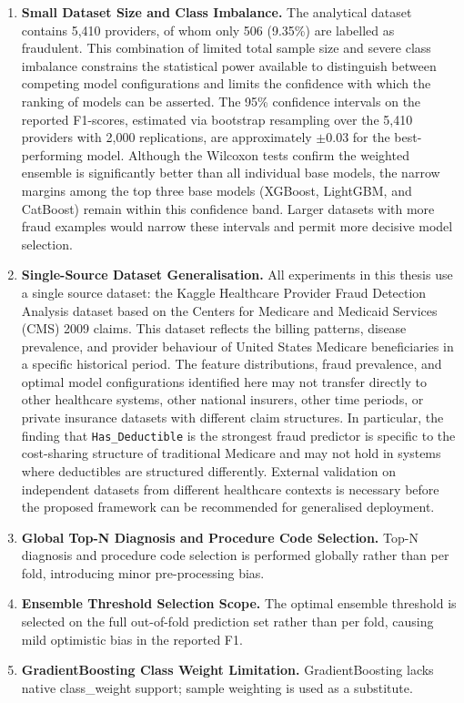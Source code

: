 \begin{enumerate}[leftmargin=*,label=\textbf{\arabic*.}]
\item \textbf{Small Dataset Size and Class Imbalance.}
The analytical dataset contains 5,410 providers, of whom only 506 (9.35\%) are labelled as fraudulent. This combination of limited total sample size and severe class imbalance constrains the statistical power available to distinguish between competing model configurations and limits the confidence with which the ranking of models can be asserted. The 95\% confidence intervals on the reported F1-scores, estimated via bootstrap resampling over the 5,410 providers with 2,000 replications, are approximately $\pm$0.03 for the best-performing model. Although the Wilcoxon tests confirm the weighted ensemble is significantly better than all individual base models, the narrow margins among the top three base models (XGBoost, LightGBM, and CatBoost) remain within this confidence band. Larger datasets with more fraud examples would narrow these intervals and permit more decisive model selection.

\item \textbf{Single-Source Dataset Generalisation.}
All experiments in this thesis use a single source dataset: the Kaggle Healthcare Provider Fraud Detection Analysis dataset based on the Centers for Medicare and Medicaid Services (CMS) 2009 claims. This dataset reflects the billing patterns, disease prevalence, and provider behaviour of United States Medicare beneficiaries in a specific historical period. The feature distributions, fraud prevalence, and optimal model configurations identified here may not transfer directly to other healthcare systems, other national insurers, other time periods, or private insurance datasets with different claim structures. In particular, the finding that \texttt{Has\_Deductible} is the strongest fraud predictor is specific to the cost-sharing structure of traditional Medicare and may not hold in systems where deductibles are structured differently. External validation on independent datasets from different healthcare contexts is necessary before the proposed framework can be recommended for generalised deployment.

\item \textbf{Global Top-N Diagnosis and Procedure Code Selection.}
Top-N diagnosis and procedure code selection is performed globally rather than per fold, introducing minor pre-processing bias.

\item \textbf{Ensemble Threshold Selection Scope.}
The optimal ensemble threshold is selected on the full out-of-fold prediction set rather than per fold, causing mild optimistic bias in the reported F1.

\item \textbf{GradientBoosting Class Weight Limitation.}
GradientBoosting lacks native class\_weight support; sample weighting is used as a substitute.

\end{enumerate}

